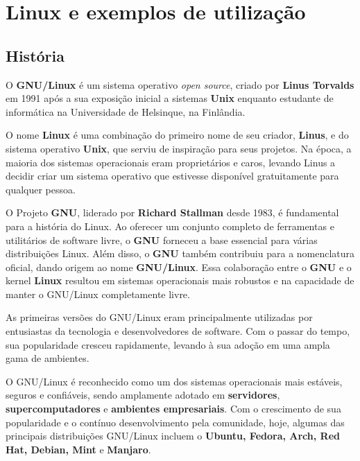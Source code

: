 ﻿\section{Linux e exemplos de utilização} \label{section: linux e exemplos}
\subsection{História}
O \textbf{GNU/Linux} é um sistema operativo \textit{open source}, criado por \textbf{Linus Torvalds} em 1991 após a sua exposição inicial a sistemas \textbf{Unix} enquanto estudante de informática na Universidade de Helsinque, na Finlândia.
\par \vspace{6pt}
O nome \textbf{Linux} é uma combinação do primeiro nome de seu criador, \textbf{Linus}, e do sistema operativo \textbf{Unix}, que serviu de inspiração para seus projetos. Na época, a maioria dos sistemas operacionais eram proprietários e caros, levando Linus a decidir criar um sistema operativo que estivesse disponível gratuitamente para qualquer pessoa.
\par \vspace{6pt}
O Projeto \textbf{GNU}, liderado por \textbf{Richard Stallman} desde 1983, é fundamental para a história do Linux. Ao oferecer um conjunto completo de ferramentas e utilitários de software livre, o \textbf{GNU} forneceu a base essencial para várias distribuições Linux. Além disso, o \textbf{GNU} também contribuiu para a nomenclatura oficial, dando origem ao nome \textbf{GNU/Linux}. Essa colaboração entre o \textbf{GNU} e o kernel \textbf{Linux} resultou em sistemas operacionais mais robustos e na capacidade de manter o GNU/Linux completamente livre.
\par \vspace{6pt}
As primeiras versões do GNU/Linux eram principalmente utilizadas por entusiastas da tecnologia e desenvolvedores de software. Com o passar do tempo, sua popularidade cresceu rapidamente, levando à sua adoção em uma ampla gama de ambientes.
\par \vspace{6pt}
O GNU/Linux é reconhecido como um dos sistemas operacionais mais estáveis, seguros e confiáveis, sendo amplamente adotado em \textbf{servidores}, \textbf{supercomputadores} e \textbf{ambientes empresariais}. Com o crescimento de sua popularidade e o contínuo desenvolvimento pela comunidade, hoje, algumas das principais distribuições GNU/Linux incluem o \textbf{Ubuntu, Fedora, Arch, Red Hat, Debian, Mint} e \textbf{Manjaro}.
\par \vspace{6pt}

